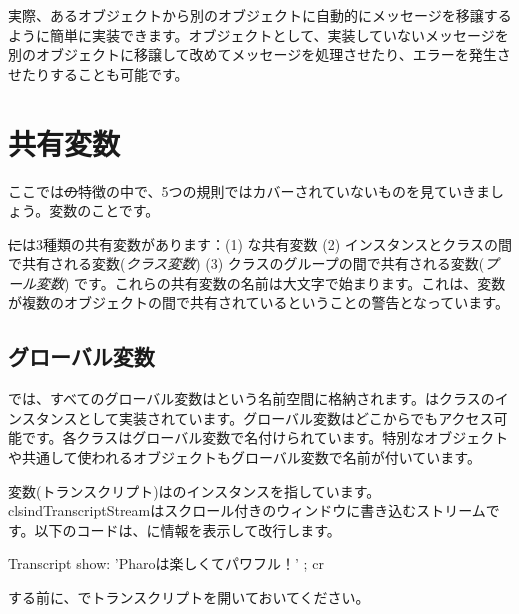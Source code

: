 \documentclass[a4paper,10pt,twoside]{book}
\begin{document}
実際、あるオブジェクトから別のオブジェクトに自動的にメッセージを移譲するように簡単に実装できます。オブジェクトとして、実装していないメッセージを別のオブジェクトに移譲して改めてメッセージを処理させたり、エラーを発生させたりすることも可能です。

\section{共有変数}

ここでは\st の特徴の中で、5つの規則ではカバーされていないものを見ていきましょう。変数のことです。

\st には3種類の共有変数があります：(1) な共有変数 (2) インスタンスとクラスの間で共有される変数(\emph{クラス変数}) (3) クラスのグループの間で共有される変数(\emph{プール変数}) です。これらの共有変数の名前は大文字で始まります。これは、変数が複数のオブジェクトの間で共有されているということの警告となっています。

\subsection{グローバル変数}
\pharo では、すべてのグローバル変数はという名前空間に格納されます。はクラスのインスタンスとして実装されています。グローバル変数はどこからでもアクセス可能です。各クラスはグローバル変数で名付けられています。特別なオブジェクトや共通して使われるオブジェクトもグローバル変数で名前が付いています。

変数(トランスクリプト)はのインスタンスを指しています。clsind{TranscriptStream}はスクロール付きのウィンドウに書き込むストリームです。以下のコードは、に情報を表示して改行します。

\begin{code}{}
Transcript show: 'Pharoは楽しくてパワフル！' ; cr
\end{code}

\noindent
{}する前に、でトランスクリプトを開いておいてください。

\end{document}
